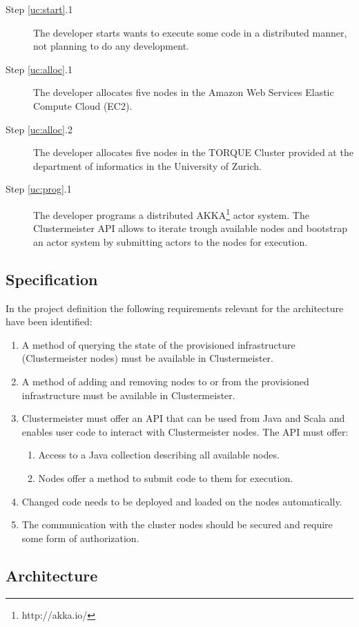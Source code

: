 \documentclass[12pt]{article}
\begin{document}
\begin{description}
\item[Step \ref{uc:start}.1] The developer starts wants to execute some code in a distributed manner, not planning to do any development.
\item[Step \ref{uc:alloc}.1] The developer allocates five nodes in the Amazon Web Services Elastic Compute Cloud (EC2).
\item[Step \ref{uc:alloc}.2] The developer allocates five nodes in the TORQUE Cluster provided at the department of informatics in the University of Zurich.
\item[Step \ref{uc:prog}.1] The developer programs a distributed AKKA\footnote{http://akka.io/} actor system. The Clustermeister API allows to iterate trough available nodes and bootstrap an actor system by submitting actors to the nodes for execution.
\end{description}

\subsection{Specification}
In the project definition the following requirements relevant for the architecture have been identified:

\begin{enumerate}
\item A method of querying the state of the provisioned infrastructure (Clustermeister nodes) must be available in Clustermeister.
\item A method of adding and removing nodes to or from the provisioned infrastructure must be available in Clustermeister.
\item Clustermeister must offer an API that can be used from Java and Scala and enables user code to interact with Clustermeister nodes. The API must offer:
\begin{enumerate}
\item Access to a Java collection describing all available nodes.
\item Nodes offer a method to submit code to them for execution.
\end{enumerate}
\item Changed code needs to be deployed and loaded on the nodes automatically.
\item The communication with the cluster nodes should be secured and require some form of authorization. 
\end{enumerate}

\subsection{Architecture}
\end{document}
